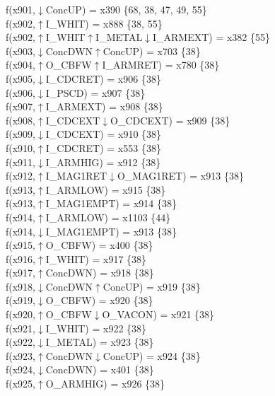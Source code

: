 f(x901,$\downarrow$ConcUP) = x390 \{68, 38, 47, 49, 55\} \\  
f(x902,$\uparrow$I\_WHIT) = x888 \{38, 55\} \\  
f(x902,$\uparrow$I\_WHIT$\uparrow$I\_METAL$\downarrow$I\_ARMEXT) = x382 \{55\} \\  
f(x903,$\downarrow$ConcDWN$\uparrow$ConcUP) = x703 \{38\} \\  
f(x904,$\uparrow$O\_CBFW$\uparrow$I\_ARMRET) = x780 \{38\} \\  
f(x905,$\downarrow$I\_CDCRET) = x906 \{38\} \\  
f(x906,$\downarrow$I\_PSCD) = x907 \{38\} \\  
f(x907,$\uparrow$I\_ARMEXT) = x908 \{38\} \\  
f(x908,$\uparrow$I\_CDCEXT$\downarrow$O\_CDCEXT) = x909 \{38\} \\  
f(x909,$\downarrow$I\_CDCEXT) = x910 \{38\} \\  
f(x910,$\uparrow$I\_CDCRET) = x553 \{38\} \\  
f(x911,$\downarrow$I\_ARMHIG) = x912 \{38\} \\  
f(x912,$\uparrow$I\_MAG1RET$\downarrow$O\_MAG1RET) = x913 \{38\} \\  
f(x913,$\uparrow$I\_ARMLOW) = x915 \{38\} \\  
f(x913,$\uparrow$I\_MAG1EMPT) = x914 \{38\} \\  
f(x914,$\uparrow$I\_ARMLOW) = x1103 \{44\} \\  
f(x914,$\downarrow$I\_MAG1EMPT) = x913 \{38\} \\  
f(x915,$\uparrow$O\_CBFW) = x400 \{38\} \\  
f(x916,$\uparrow$I\_WHIT) = x917 \{38\} \\  
f(x917,$\uparrow$ConcDWN) = x918 \{38\} \\  
f(x918,$\downarrow$ConcDWN$\uparrow$ConcUP) = x919 \{38\} \\  
f(x919,$\downarrow$O\_CBFW) = x920 \{38\} \\  
f(x920,$\uparrow$O\_CBFW$\downarrow$O\_VACON) = x921 \{38\} \\  
f(x921,$\downarrow$I\_WHIT) = x922 \{38\} \\  
f(x922,$\downarrow$I\_METAL) = x923 \{38\} \\  
f(x923,$\uparrow$ConcDWN$\downarrow$ConcUP) = x924 \{38\} \\  
f(x924,$\downarrow$ConcDWN) = x401 \{38\} \\  
f(x925,$\uparrow$O\_ARMHIG) = x926 \{38\} \\  
